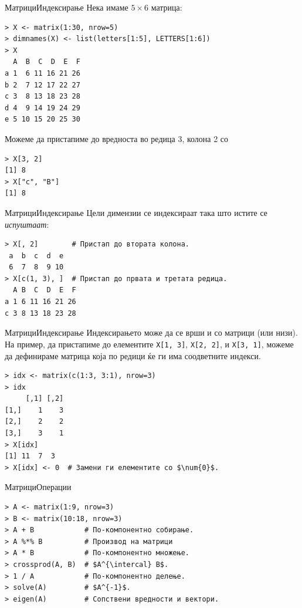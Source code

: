 \documentclass[hyperref={unicode}, xcolor={svgnames, table},
usepdftitle=false]{beamer}
\theoremstyle{remark}
\begin{document}
\begin{frame}[fragile]{Матрици}{Индексирање}
  Нека имаме \(5 \times 6\) матрица:
\begin{verbatim}
> X <- matrix(1:30, nrow=5)
> dimnames(X) <- list(letters[1:5], LETTERS[1:6])
> X
  A  B  C  D  E  F
a 1  6 11 16 21 26
b 2  7 12 17 22 27
c 3  8 13 18 23 28
d 4  9 14 19 24 29
e 5 10 15 20 25 30
\end{verbatim}

  Можеме да пристапиме до вредноста во редица \num{3}, колона \num{2} со
\begin{verbatim}
> X[3, 2]
[1] 8
> X["c", "B"]
[1] 8
\end{verbatim}
\end{frame}

\begin{frame}[fragile]{Матрици}{Индексирање}
  Цели димензии се индексираат така што истите се \emph{испуштаат}:
\begin{verbatim}
> X[, 2]        # Пристап до втората колона.
 a  b  c  d  e
 6  7  8  9 10
> X[c(1, 3), ]  # Пристап до првата и третата редица.
  A B  C  D  E  F
a 1 6 11 16 21 26
c 3 8 13 18 23 28
\end{verbatim}
\end{frame}

\begin{frame}[fragile]{Матрици}{Индексирање}
  Индексирањето може да се врши и со матрици (или низи).  На пример, да
  пристапиме до елементите \texttt{X[1, 3]}, \texttt{X[2, 2]}, и
  \texttt{X[3, 1]}, можеме да дефинираме матрица која по редици ќе ги има
  соодветните индекси.
\begin{verbatim}
> idx <- matrix(c(1:3, 3:1), nrow=3)
> idx
     [,1] [,2]
[1,]    1    3
[2,]    2    2
[3,]    3    1
> X[idx]
[1] 11  7  3
> X[idx] <- 0  # Замени ги елементите со $\num{0}$.
\end{verbatim}
\end{frame}

\begin{frame}[fragile]{Матрици}{Операции}
\begin{verbatim}
> A <- matrix(1:9, nrow=3)
> B <- matrix(10:18, nrow=3)
> A + B            # По-компонентно собирање.
> A %*% B          # Производ на матрици
> A * B            # По-компонентно множење.
> crossprod(A, B)  # $A^{\intercal} B$.
> 1 / A            # По-компонентно делење.
> solve(A)         # $A^{-1}$.
> eigen(A)         # Сопствени вредности и вектори.
\end{verbatim}
\end{frame}
\end{document}

